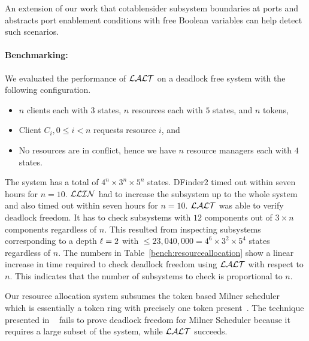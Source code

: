 An extension of our work that cotablensider subsystem boundaries at ports and abstracts port enablement 
conditions with free Boolean variables can help
detect such scenarios. 

\begin{table}
\label{bench:resourceallocation}
\end{table}

\paragraph{Benchmarking:}

We evaluated the performance of $\mathcal{LALT}$ on a deadlock free system with the following configuration. 
\begin{itemize}
\item $n$ clients each with $3$ states, $n$ resources each with $5$ states, and $n$ tokens,
\item Client $C_i, 0\leq i < n$ requests resource $i$, and 
\item No resources are in conflict, hence we have $n$ resource managers each with $4$ states. 
\end{itemize}

The system has a total of $4^n \times 3^n \times 5^n$ states. 
DFinder2 timed out within seven hours for $n=10$. 
$\mathcal{LLIN}$ had to increase the subsystem up to the whole system and also timed out within seven hours for $n=10$. 
$\mathcal{LALT}$ was able to verify deadlock freedom. It has to check subsystems with $12$ components out of $3\times n$ components regardless of $n$. 
This resulted from inspecting subsystems corresponding to a depth $\ell=2$ with $\leq 23,040,000=4^{6} \times 3^2\times 5^4$ states regardless of $n$.
The numbers in Table~\ref{bench:resourceallocation} show a linear increase in time required to check deadlock freedom 
using $\mathcal{LALT}$ with respect to $n$. This indicates that the number of subsystems to check is proportional to $n$. 

Our resource allocation system subsumes the token based Milner scheduler~\cite{milner} which 
is essentially a token ring with precisely one token present~\cite{AGR16}. 
The technique presented in ~\cite{AGR16} fails to prove deadlock freedom for Milner Scheduler 
because it requires a large subset of the system, 
while $\mathcal{LALT}$ succeeds. 
